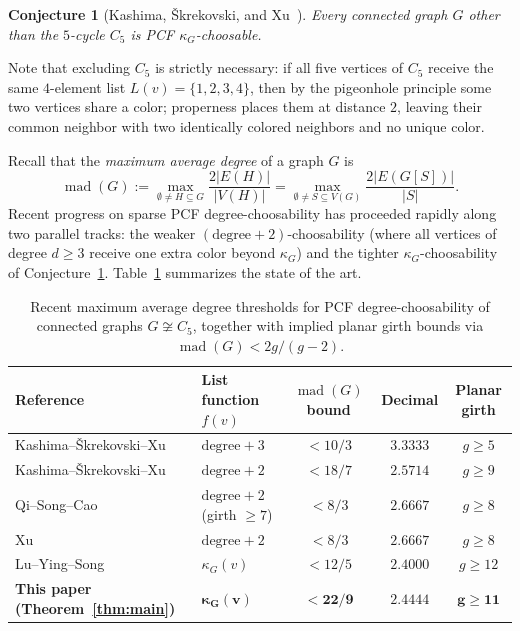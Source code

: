 \documentclass[11pt,a4paper]{article}
\newtheorem{conjecture}[theorem]{Conjecture}
\theoremstyle{definition}
\newcommand{\mad}{\operatorname{mad}}
\begin{document}
\begin{conjecture}[Kashima, \v{S}krekovski, and Xu~\cite{Kashima2025}]\label{conj:kappa}
Every connected graph $G$ other than the $5$-cycle $C_5$ is PCF $\kappa_G$-choosable.
\end{conjecture}

Note that excluding $C_5$ is strictly necessary: if all five vertices of $C_5$ receive the same $4$-element list $L(v) = \{1,2,3,4\}$, then by the pigeonhole principle some two vertices share a color; properness places them at distance $2$, leaving their common neighbor with two identically colored neighbors and no unique color.

Recall that the \emph{maximum average degree} of a graph $G$ is
\[
  \mad(G) := \max_{\emptyset \neq H \subseteq G} \frac{2|E(H)|}{|V(H)|} = \max_{\emptyset \neq S \subseteq V(G)} \frac{2|E(G[S])|}{|S|}.
\]
Recent progress on sparse PCF degree-choosability has proceeded rapidly along two parallel tracks: the weaker $(\mathrm{degree}+2)$-choosability (where all vertices of degree $d \ge 3$ receive one extra color beyond $\kappa_G$) and the tighter $\kappa_G$-choosability of Conjecture~\ref{conj:kappa}. Table~\ref{tab:sota} summarizes the state of the art.

\begin{table}[t]
\centering
\caption{Recent maximum average degree thresholds for PCF degree-choosability of connected graphs $G \not\cong C_5$, together with implied planar girth bounds via $\mad(G) < 2g/(g-2)$.}
\label{tab:sota}
\small
\begin{tabular}{@{}llccc@{}}
\toprule
Reference & List function $f(v)$ & $\mad(G)$ bound & Decimal & Planar girth \\
\midrule
Kashima--\v{S}krekovski--Xu~\cite{Kashima2026} & $\mathrm{degree}+3$ & $< 10/3$ & $3.3333$ & $g \ge 5$ \\
Kashima--\v{S}krekovski--Xu~\cite{Kashima2026} & $\mathrm{degree}+2$ & $< 18/7$ & $2.5714$ & $g \ge 9$ \\
Qi--Song--Cao~\cite{QiSongCao2026} & $\mathrm{degree}+2$ (girth $\ge 7$) & $< 8/3$ & $2.6667$ & $g \ge 8$ \\
Xu~\cite{Xu2026} & $\mathrm{degree}+2$ & $< 8/3$ & $2.6667$ & $g \ge 8$ \\
\midrule
Lu--Ying--Song~\cite{LuYingSong2026} & $\kappa_G(v)$ & $< 12/5$ & $2.4000$ & $g \ge 12$ \\
\textbf{This paper (Theorem~\ref{thm:main})} & $\boldsymbol{\kappa_G(v)}$ & $\mathbf{< 22/9}$ & $\mathbf{2.4444}$ & $\mathbf{g \ge 11}$ \\
\bottomrule
\end{tabular}
\end{table}
\end{document}
